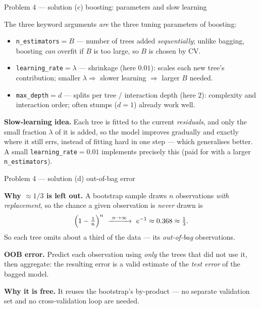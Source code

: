 \documentclass[aspectratio=169,11pt]{beamer}
\begin{document}
\begin{frame}{Problem 4 --- solution (c) boosting: parameters and slow learning}
  \begin{solutionbox}
    The three keyword arguments \emph{are} the three tuning parameters of boosting:
    \begin{itemize}
      \item \texttt{n\_estimators}${}=B$ --- number of trees added \emph{sequentially}; unlike
        bagging, boosting \emph{can} overfit if $B$ is too large, so $B$ is chosen by CV.
      \item \texttt{learning\_rate}${}=\lambda$ --- shrinkage (here $0.01$): scales each new
        tree's contribution; smaller $\lambda\Rightarrow$ slower learning $\Rightarrow$ larger $B$
        needed.
      \item \texttt{max\_depth}${}=d$ --- splits per tree / interaction depth (here $2$):
        complexity and interaction order; often stumps ($d=1$) already work well.
    \end{itemize}
    \textbf{Slow-learning idea.} Each tree is fitted to the current \emph{residuals}, and only the
    small fraction $\lambda$ of it is added, so the model improves gradually and exactly where it
    still errs, instead of fitting hard in one step --- which generalises better. A small
    \texttt{learning\_rate}${}=0.01$ implements precisely this (paid for with a larger
    \texttt{n\_estimators}).
  \end{solutionbox}
\end{frame}

\begin{frame}{Problem 4 --- solution (d) out-of-bag error}
  \begin{solutionbox}
    \textbf{Why $\approx1/3$ is left out.} A bootstrap sample draws $n$ observations \emph{with
    replacement}, so the chance a given observation is \emph{never} drawn is
    \[
      \Bigl(1-\tfrac1n\Bigr)^{n}\ \xrightarrow{\ n\to\infty\ }\ e^{-1}\approx0.368\approx\tfrac13 .
    \]
    So each tree omits about a third of the data --- its \emph{out-of-bag} observations.
    \medskip

    \textbf{OOB error.} Predict each observation using \emph{only} the trees that did not use it,
    then aggregate: the resulting error is a valid estimate of the \emph{test error} of the
    bagged model.
    \medskip

    \textbf{Why it is free.} It reuses the bootstrap's by-product --- no separate validation set
    and no cross-validation loop are needed.
  \end{solutionbox}
\end{frame}
\end{document}
